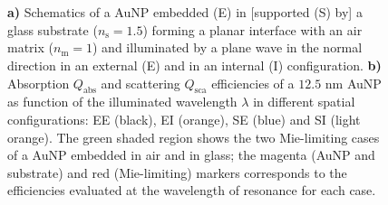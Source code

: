 \begin{figure}[b!]
    \small
    \centering
    \hspace*{-.75\textwidth}%
        \begin{subfigure}{.37\textwidth}\caption{ }\label{sfig:TotallyNormal:1}\end{subfigure}%
        \begin{subfigure}{.25\textwidth}\caption{ }\label{sfig:TotallyNormal:2}\end{subfigure} \\[6em]
    \hspace*{-.38\textwidth}%
        \begin{subfigure}{.25\textwidth}\caption{ }\label{sfig:TotallyNormal:3}\end{subfigure} \\[-9em]
    \def\svgwidth{.95\textwidth}
    \vspace*{0em}
    \caption[Absorption and Scattering Efficiencies of a 12.5 nm AuNP above and below a planar Interface Illuminated at Normal Incidence]{\textbf{a)} Schematics of a AuNP embedded (E) in [supported (S) by] a glass substrate ($n_\text{s} = 1.5$) forming a planar interface with an air matrix ($n_\text{m} = 1$) and illuminated by a plane wave in the normal direction in an external (E) and in an internal (I) configuration. \textbf{b)} Absorption $Q_\text{abs}$ and scattering $Q_\text{sca}$ efficiencies of a $12.5$ nm AuNP as function of the illuminated wavelength $\lambda$ in different spatial configurations: EE (black), EI (orange), SE (blue) and SI (light orange). The green shaded region shows the two Mie-limiting cases of a  AuNP embedded in air and in glass; the magenta (AuNP and substrate) and red (Mie-limiting) markers corresponds to the efficiencies evaluated at the wavelength of resonance for each case.
    }
\label{fig:TotallyNormal}
\end{figure}

